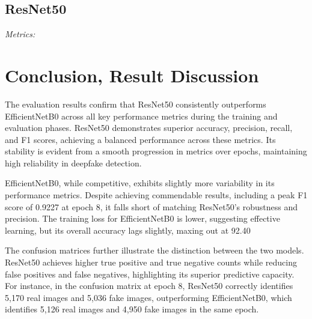 \documentclass[conference]{IEEEtran}
\begin{document}
\subsection*{ResNet50}
\textit{Metrics:}  
\begin{center}
\end{center} 

\section*{Conclusion, Result Discussion}
The evaluation results confirm that ResNet50 consistently outperforms EfficientNetB0 across all key performance metrics during the training and evaluation phases. ResNet50 demonstrates superior accuracy, precision, recall, and F1 scores, achieving a balanced performance across these metrics. Its stability is evident from a smooth progression in metrics over epochs, maintaining high reliability in deepfake detection.

EfficientNetB0, while competitive, exhibits slightly more variability in its performance metrics. Despite achieving commendable results, including a peak F1 score of 0.9227 at epoch 8, it falls short of matching ResNet50's robustness and precision. The training loss for EfficientNetB0 is lower, suggesting effective learning, but its overall accuracy lags slightly, maxing out at 92.40%

The confusion matrices further illustrate the distinction between the two models. ResNet50 achieves higher true positive and true negative counts while reducing false positives and false negatives, highlighting its superior predictive capacity. For instance, in the confusion matrix at epoch 8, ResNet50 correctly identifies 5,170 real images and 5,036 fake images, outperforming EfficientNetB0, which identifies 5,126 real images and 4,950 fake images in the same epoch.
\end{document}
